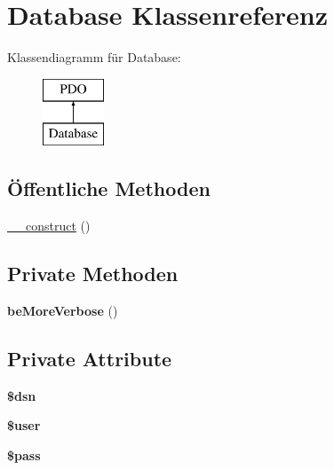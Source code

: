 \hypertarget{class_database}{\section{Database Klassenreferenz}
\label{class_database}
}
Klassendiagramm für Database\-:\begin{figure}[H]
\begin{center}
\leavevmode
\includegraphics[height=2.000000cm]{class_database}
\end{center}
\end{figure}
\subsection*{Öffentliche Methoden}
\begin{DoxyCompactItemize}
\item 
\hyperlink{class_database_a2852f635197e76a838486e64e00aac9f}{\-\_\-\-\_\-construct} ()
\end{DoxyCompactItemize}
\subsection*{Private Methoden}
\begin{DoxyCompactItemize}
\item 
\hypertarget{class_database_a669fc0eb6ea0dc6bb76411e0338886c7}{{\bfseries be\-More\-Verbose} ()}\label{class_database_a669fc0eb6ea0dc6bb76411e0338886c7}

\end{DoxyCompactItemize}
\subsection*{Private Attribute}
\begin{DoxyCompactItemize}
\item 
\hypertarget{class_database_acf4bc044b7d1c3e54536ea4f2b0da56a}{{\bfseries \$dsn}}\label{class_database_acf4bc044b7d1c3e54536ea4f2b0da56a}

\item 
\hypertarget{class_database_ae9e43fb2a274428ec75ae70be7ab045f}{{\bfseries \$user}}\label{class_database_ae9e43fb2a274428ec75ae70be7ab045f}

\item 
\hypertarget{class_database_a8783a2890064e9d86b48a55fa09432f5}{{\bfseries \$pass}}\label{class_database_a8783a2890064e9d86b48a55fa09432f5}

\end{DoxyCompactItemize}


